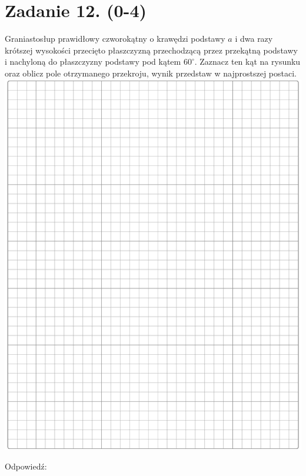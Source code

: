 \documentclass[10pt]{article}
\begin{document}
\section*{Zadanie 12. (0-4)}
Graniastosłup prawidłowy czworokątny o krawędzi podstawy \(a\) i dwa razy krótszej wysokości przecięto płaszczyzną przechodzącą przez przekątną podstawy i nachyloną do płaszczyzny podstawy pod kątem \(60^{\circ}\). Zaznacz ten kąt na rysunku oraz oblicz pole otrzymanego przekroju, wynik przedstaw w najprostszej postaci.\\
\includegraphics[max width=\textwidth, center]{2024_11_21_d15133c79177ee6989d3g-07}

Odpowiedź:
\end{document}
